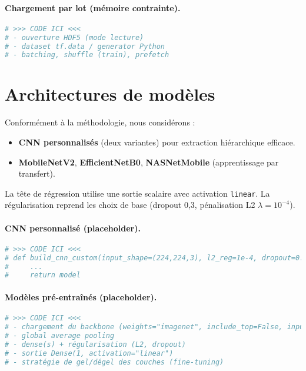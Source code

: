 \paragraph{Chargement par lot (mémoire contrainte).}
\begin{lstlisting}[language=Python,caption={(Placeholder) DataLoader/TFDataset depuis HDF5},label={lst:dataloader}]
# >>> CODE ICI <<<
# - ouverture HDF5 (mode lecture)
# - dataset tf.data / generator Python
# - batching, shuffle (train), prefetch
\end{lstlisting}

\section{Architectures de modèles}
\label{sec:modeles}

Conformément à la méthodologie, nous considérons :
\begin{itemize}
    \item \textbf{CNN personnalisés} (deux variantes) pour extraction hiérarchique efficace.
    \item \textbf{MobileNetV2}, \textbf{EfficientNetB0}, \textbf{NASNetMobile} (apprentissage par transfert).
\end{itemize}
La tête de régression utilise une sortie scalaire avec activation \texttt{linear}. La régularisation reprend les choix de base (dropout 0{,}3, pénalisation L2 \(\lambda=10^{-4}\)).

\paragraph{CNN personnalisé (placeholder).}
\begin{lstlisting}[language=Python,caption={(Placeholder) Définition d'un CNN personnalisé (Keras)},label={lst:cnn_custom}]
# >>> CODE ICI <<<
# def build_cnn_custom(input_shape=(224,224,3), l2_reg=1e-4, dropout=0.3):
#     ...
#     return model
\end{lstlisting}

\paragraph{Modèles pré-entraînés (placeholder).}
\begin{lstlisting}[language=Python,caption={(Placeholder) Transfer learning MobileNetV2/EfficientNetB0/NASNetMobile},label={lst:transfer}]
# >>> CODE ICI <<<
# - chargement du backbone (weights="imagenet", include_top=False, input_shape=224x224x3)
# - global average pooling
# - dense(s) + régularisation (L2, dropout)
# - sortie Dense(1, activation="linear")
# - stratégie de gel/dégel des couches (fine-tuning)
\end{lstlisting}

